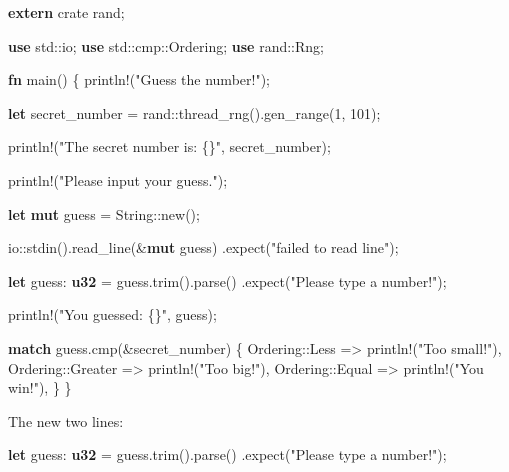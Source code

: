 \documentclass[a4paper,]{book}
\newenvironment{Shaded}{\begin{snugshade}}{\end{snugshade}}
\newcommand{\KeywordTok}[1]{\textcolor[rgb]{0.13,0.29,0.53}{\textbf{{#1}}}}
\newcommand{\DecValTok}[1]{\textcolor[rgb]{0.00,0.00,0.81}{{#1}}}
\newcommand{\StringTok}[1]{\textcolor[rgb]{0.31,0.60,0.02}{{#1}}}
\newcommand{\OtherTok}[1]{\textcolor[rgb]{0.56,0.35,0.01}{{#1}}}
\newcommand{\NormalTok}[1]{{#1}}
\begin{document}
\begin{Shaded}
\begin{Highlighting}[]
\KeywordTok{extern} \NormalTok{crate rand;}

\KeywordTok{use} \NormalTok{std::io;}
\KeywordTok{use} \NormalTok{std::cmp::Ordering;}
\KeywordTok{use} \NormalTok{rand::Rng;}

\KeywordTok{fn} \NormalTok{main() \{}
    \OtherTok{println!}\NormalTok{(}\StringTok{"Guess the number!"}\NormalTok{);}

    \KeywordTok{let} \NormalTok{secret_number = rand::thread_rng().gen_range(}\DecValTok{1}\NormalTok{, }\DecValTok{101}\NormalTok{);}

    \OtherTok{println!}\NormalTok{(}\StringTok{"The secret number is: \{\}"}\NormalTok{, secret_number);}

    \OtherTok{println!}\NormalTok{(}\StringTok{"Please input your guess."}\NormalTok{);}

    \KeywordTok{let} \KeywordTok{mut} \NormalTok{guess = String::new();}

    \NormalTok{io::stdin().read_line(&}\KeywordTok{mut} \NormalTok{guess)}
        \NormalTok{.expect(}\StringTok{"failed to read line"}\NormalTok{);}

    \KeywordTok{let} \NormalTok{guess: }\KeywordTok{u32} \NormalTok{= guess.trim().parse()}
        \NormalTok{.expect(}\StringTok{"Please type a number!"}\NormalTok{);}

    \OtherTok{println!}\NormalTok{(}\StringTok{"You guessed: \{\}"}\NormalTok{, guess);}

    \KeywordTok{match} \NormalTok{guess.cmp(&secret_number) \{}
        \NormalTok{Ordering::Less    => }\OtherTok{println!}\NormalTok{(}\StringTok{"Too small!"}\NormalTok{),}
        \NormalTok{Ordering::Greater => }\OtherTok{println!}\NormalTok{(}\StringTok{"Too big!"}\NormalTok{),}
        \NormalTok{Ordering::Equal   => }\OtherTok{println!}\NormalTok{(}\StringTok{"You win!"}\NormalTok{),}
    \NormalTok{\}}
\NormalTok{\}}
\end{Highlighting}
\end{Shaded}

The new two lines:

\begin{Shaded}
\begin{Highlighting}[]
    \KeywordTok{let} \NormalTok{guess: }\KeywordTok{u32} \NormalTok{= guess.trim().parse()}
        \NormalTok{.expect(}\StringTok{"Please type a number!"}\NormalTok{);}
\end{Highlighting}
\end{Shaded}
\end{document}
